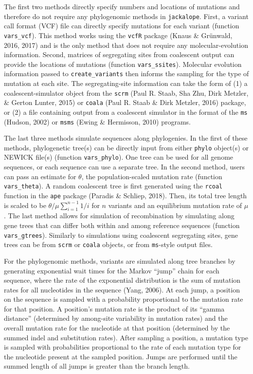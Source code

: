 \documentclass[12pt,]{article}
\begin{document}
The first two methods directly specify numbers and locations of mutations and
therefore do not require any phylogenomic methods in \texttt{jackalope}.
First, a variant call format (VCF) file can directly specify mutations for each
variant (function \texttt{vars\_vcf}).
This method works using the \texttt{vcfR} package (Knaus \& Grünwald, 2016, 2017) and
is the only method that does not require any molecular-evolution information.
Second, matrices of segregating sites from coalescent output can provide the locations
of mutations (function \texttt{vars\_ssites}).
Molecular evolution information passed to \texttt{create\_variants} then informs the sampling
for the type of mutation at each site.
The segregating-site information can take the form of
(1) a coalescent-simulator object from the \texttt{scrm} (Paul R. Staab, Sha Zhu, Dirk Metzler, \& Gerton Lunter, 2015) or
\texttt{coala} (Paul R. Staab \& Dirk Metzler, 2016) package, or
(2) a file containing output from a coalescent simulator in the format of the
\texttt{ms} (Hudson, 2002) or
\texttt{msms} (Ewing \& Hermisson, 2010) programs.

The last three methods simulate sequences along phylogenies.
In the first of these methods,
phylogenetic tree(s) can be directly input from either \texttt{phylo} object(s) or
NEWICK file(s) (function \texttt{vars\_phylo}).
One tree can be used for all genome sequences, or each sequence can use a separate tree.
In the second method, users can pass an estimate for \(\theta\), the population-scaled
mutation rate (function \texttt{vars\_theta}).
A random coalescent tree is first generated using the \texttt{rcoal} function
in the \texttt{ape} package (Paradis \& Schliep, 2018).
Then, its total tree length is scaled to be
\(\theta / \mu \sum_{i=1}^{n-1}{1 / i}\) for \(n\) variants and an equilibrium
mutation rate of \(\mu\).
The last method allows for simulation of recombination by simulating along
gene trees that can differ both within and among reference sequences
(function \texttt{vars\_gtrees}).
Similarly to simulations using coalescent segregating sites, gene trees can be
from \texttt{scrm} or \texttt{coala} objects, or from \texttt{ms}-style output files.

For the phylogenomic methods, variants are simulated along tree branches by
generating exponential wait times
for the Markov ``jump'' chain for each sequence,
where the rate of the exponential distribution is the sum of mutation rates for
all nucleotides in the sequence (Yang, 2006).
At each jump, a position on the sequence is sampled with a probability proportional to
the mutation rate for that position.
A position's mutation rate is the product of its ``gamma distance''
(determined by among-site variability in mutation rates) and the overall mutation rate
for the nucleotide at that position
(determined by the summed indel and substitution rates).
After sampling a position, a mutation type is sampled with probabilities
proportional to the rate of each mutation type for the nucleotide
present at the sampled position.
Jumps are performed until the summed length of all jumps is greater than the
branch length.
\end{document}
